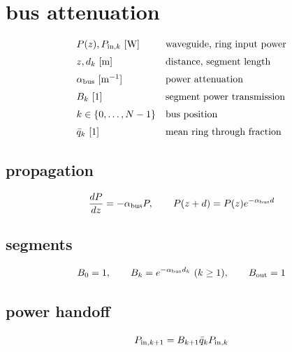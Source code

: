\section*{bus attenuation}
\[
\begin{array}{ll}P(z),P_{{\rm in},k}\ [\mathrm W]&\text{waveguide, ring input power}\\[0.6em]z,d_k\ [\mathrm m]&\text{distance, segment length}\\[0.6em]\alpha_{\rm bus}\ [\mathrm{m^{-1}}]&\text{power attenuation}\\[0.6em]B_k\ [1]&\text{segment power transmission}\\[0.6em]k\in\{0,\ldots,N-1\}&\text{bus position}\\[0.6em]\bar q_k\ [1]&\text{mean ring through fraction}\end{array}
\]
\subsection*{propagation}
\[
\displaystyle \frac{dP}{dz}=-\alpha_{\rm bus}P,\qquad P(z+d)=P(z)e^{-\alpha_{\rm bus}d}
\]
\subsection*{segments}
\[
\displaystyle B_0=1,\qquad B_k=e^{-\alpha_{\rm bus}d_k}\ (k\ge1),\qquad B_{\rm out}=1
\]
\subsection*{power handoff}
\[
\displaystyle P_{{\rm in},k+1}=B_{k+1}\bar q_kP_{{\rm in},k}
\]
